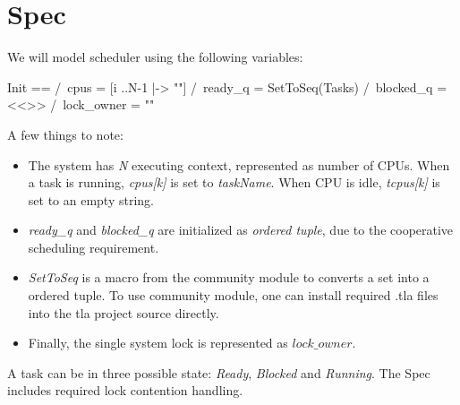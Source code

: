 \section{Spec}

We will model scheduler using the following variables:\newline
\begin{tla}
Init ==
    /\ cpus = [i ..N-1 |-> ""] 
    /\ ready_q = SetToSeq(Tasks)
    /\ blocked_q = <<>>
    /\ lock_owner = ""
\end{tla}
\begin{tlatex}
%
%
%
%
\end{tlatex}
\newline

A few things to note:
\begin{itemize}
    \item The system has \textit{N} executing context, represented as number of CPUs.
    When a task is running, \textit{cpus[k]} is set to \textit{taskName}. When CPU is idle,
    \textit{tcpus[k]} is set to an empty string. 
    \item \textit{ready\_q} and \textit{blocked\_q} are initialized as \textit{ordered tuple},
    due to the cooperative scheduling requirement.
    \item \textit{SetToSeq} is a macro from the community module \cite{tla_comm}
    to converts a set into a ordered tuple. To use community module, one can
    install required .tla files into the tla project source directly.
    \item Finally, the single system lock is represented as $lock\_owner$. 
\end{itemize}

A task can be in three possible state: \textit{Ready}, \textit{Blocked} and
\textit{Running}. The Spec includes required lock contention handling.\newline

